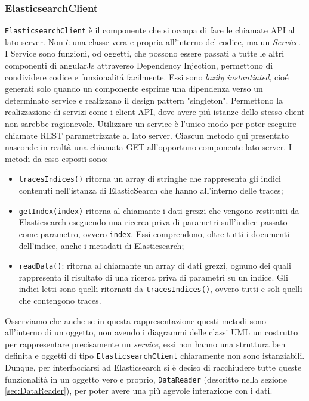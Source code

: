 \subsubsection{ElasticsearchClient} 
\texttt{ElasticsearchClient} è il componente che si occupa di fare le chiamate API al lato server. Non è una classe vera e propria all'interno del codice, ma un \emph{Service}. 
I Service sono funzioni, od oggetti, che possono essere passati a tutte le altri componenti di angularJs attraverso Dependency Injection, permettono di condividere codice e funzionalitá facilmente. Essi sono \emph{lazily instantiated}, cioé generati solo quando un componente esprime una dipendenza verso un determinato service e realizzano il design pattern "singleton". Permettono la realizzazione di servizi come i client API, dove avere piú istanze dello stesso client non sarebbe ragionevole. 
Utilizzare un service è l'unico modo per poter eseguire chiamate REST parametrizzate al lato server. Ciascun metodo qui presentato nasconde in realtà una chiamata GET all'opportuno componente lato server. I metodi da esso esposti sono: 
\begin{itemize} 
  \item \texttt{tracesIndices()} ritorna un array di stringhe che rappresenta gli indici contenuti nell'istanza di ElasticSearch che hanno all'interno delle traces; 
  \item \texttt{getIndex(index)} ritorna al chiamante i dati grezzi che vengono restituiti da Elasticsearch eseguendo una ricerca priva di parametri sull'indice passato come parametro, ovvero \texttt{index}. Essi comprendono, oltre tutti i documenti dell'indice, anche i metadati di Elasticsearch; 
  \item \texttt{readData()}: ritorna al chiamante un array di dati grezzi, ognuno dei quali rappresenta il risultato di una ricerca priva di parametri su un indice. Gli indici letti sono quelli ritornati da \texttt{tracesIndices()}, ovvero tutti e soli quelli che contengono traces. 
\end{itemize} 
Osserviamo che anche se in questa rappresentazione questi metodi sono all'interno di un oggetto, non avendo i diagrammi delle classi UML un costrutto per rappresentare precisamente un \emph{service}, essi non hanno una struttura ben definita e oggetti di tipo \texttt{ElasticsearchClient} chiaramente non sono istanziabili. Dunque, per interfacciarsi ad Elasticsearch si è deciso di racchiudere tutte queste funzionalità in un oggetto vero e proprio, \texttt{DataReader} (descritto nella sezione \ref{sec:DataReader}), per poter avere una più agevole interazione con i dati. 
 

